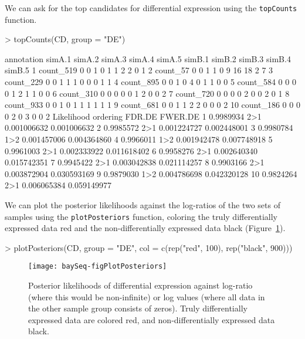 \documentclass[a4paper]{article}
\begin{document}
We can ask for the top candidates for differential expression using the \verb'topCounts' function.
\begin{Schunk}
\begin{Sinput}
> topCounts(CD, group = "DE")  
\end{Sinput}
\begin{Soutput}
   annotation simA.1 simA.2 simA.3 simA.4 simA.5 simB.1 simB.2 simB.3 simB.4 simB.5
1   count_519      0      0      1      0      1      1      2      2      0      1
2    count_57      0      0      1      1      0      9     16     18      2      7
3   count_229      0      0      1      1      1      0      0      0      1      1
4   count_895      0      0      1      0      4      0      1      1      0      0
5   count_584      0      0      0      0      1      2      1      1      0      0
6   count_310      0      0      0      0      0      1      2      0      0      2
7   count_720      0      0      0      0      2      0      0      2      0      1
8   count_933      0      0      1      0      1      1      1      1      1      1
9   count_681      0      0      1      1      2      2      0      0      0      2
10  count_186      0      0      0      0      2      0      3      0      0      2
   Likelihood ordering      FDR.DE     FWER.DE
1   0.9989934      2>1 0.001006632 0.001006632
2   0.9985572      2>1 0.001224727 0.002448001
3   0.9980784      1>2 0.001457006 0.004364860
4   0.9966011      1>2 0.001942478 0.007748918
5   0.9961003      2>1 0.002333922 0.011618402
6   0.9958276      2>1 0.002640340 0.015742351
7   0.9945422      2>1 0.003042838 0.021114257
8   0.9903166      2>1 0.003872904 0.030593169
9   0.9879030      1>2 0.004786698 0.042320128
10  0.9824264      2>1 0.006065384 0.059149977
\end{Soutput}
\end{Schunk}

We can plot the posterior likelihoods against the log-ratios of the two sets of samples using the \verb'plotPosteriors' function, coloring the truly differentially expressed data red and the non-differentially expressed data black (Figure~\ref{figPPs}).
\begin{Schunk}
\begin{Sinput}
> plotPosteriors(CD, group = "DE", col = c(rep("red", 100), rep("black", 900)))
\end{Sinput}
\end{Schunk}

\begin{figure}[!ht]
\begin{center}

\texttt{[image: baySeq-figPlotPosteriors]}
\caption{Posterior likelihoods of differential expression against log-ratio (where this would be non-infinite) or log values (where all data in the other sample group consists of zeros). Truly differentially expressed data are colored red, and non-differentially expressed data black.}
\label{figPPs}
\end{center}
\end{figure}
\end{document}
